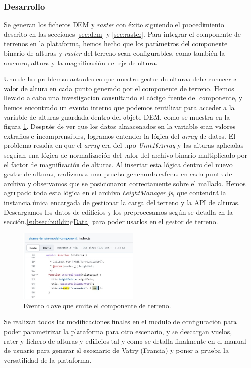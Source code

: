 \documentclass[a4paper, 11pt]{book}
\begin{document}
\subsubsection{Desarrollo}
Se generan los ficheros \textsc{DEM} y \emph{\gls{raster}} con éxito siguiendo el procedimiento descrito en las secciones \ref{sec:dem} y \ref{sec:raster}. Para integrar el componente de terrenos en la plataforma, hemos hecho que los parámetros del componente binario de alturas y \emph{raster} del terreno sean configurables, como también la anchura, altura y la magnificación del eje de altura.

Uno de los problemas actuales es que nuestro gestor de alturas debe conocer el valor de altura en cada punto generado por el componente de terreno. Hemos llevado a cabo una investigación consultando el código fuente del componente, y hemos encontrado un evento interno que podemos reutilizar para acceder a la variable de alturas guardada dentro del objeto \textsc{DEM}, como se muestra en la figura \ref{fig:terrain_evento}. Después de ver que los datos almacenados en la variable eran valores extraños e incomprensibles, logramos entender la lógica del \emph{array} de datos. 
El problema residía en que el \emph{array} era del tipo \emph{Uint16Array} y las alturas aplicadas seguían una lógica de normalización del valor del archivo binario multiplicado por el factor de magnificación de alturas. Al insertar esta lógica dentro del nuevo gestor de alturas, realizamos una prueba generando esferas en cada punto del archivo y observamos que se posicionaron correctamente sobre el mallado.
Hemos agrupado toda esta lógica en el archivo \emph{heightManager.js}, que contendrá la instancia única encargada de gestionar la carga del terreno y la \textsc{\gls{API}} de alturas.
Descargamos los datos de edificios y los preprocesamos según se detalla en la sección.\ref{subsec:buildingData} para poder usarlos en el gestor de terreno.

\begin{figure}[h]
  \centering
  \includegraphics[width=6cm, keepaspectratio]{img/terrain_evento.jpg}
  \caption{Evento clave que emite el componente de terreno.}
  \label{fig:terrain_evento}
\end{figure}
Se realizan todos las modificaciones finales en el modulo de configuración para poder parametrizar la plataforma para otro escenario, y se descargan vuelos, rater y fichero de alturas y edificios tal y como se detalla finalmente en el manual de usuario para generar el escenario de Vatry (Francia) y poner a prueba la versatilidad de la plataforma.
\end{document}
